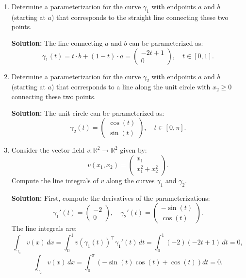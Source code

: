 \documentclass{article}
\begin{document}
\begin{enumerate}
    \item Determine a parameterization for the curve \(\gamma_1\) with endpoints \( a \) and \( b \) (starting at \( a \)) that corresponds to the straight line connecting these two points.
    
    \textbf{Solution:}
    The line connecting \( a \) and \( b \) can be parameterized as:
    \[
    \gamma_1(t) = t \cdot b + (1 - t) \cdot a = \begin{pmatrix} -2t + 1 \\ 0 \end{pmatrix}, \quad t \in [0, 1].
    \]

    \item Determine a parameterization for the curve \(\gamma_2\) with endpoints \( a \) and \( b \) (starting at \( a \)) that corresponds to a line along the unit circle with \( x_2 \geq 0 \) connecting these two points.
    
    \textbf{Solution:}
    The unit circle can be parameterized as:
    \[
    \gamma_2(t) = \begin{pmatrix} \cos(t) \\ \sin(t) \end{pmatrix}, \quad t \in [0, \pi].
    \]

    \item Consider the vector field \( v : \mathbb{R}^2 \rightarrow \mathbb{R}^2 \) given by:
    \[
    v(x_1, x_2) = \begin{pmatrix} x_1 \\ x_1^2 + x_2^2 \end{pmatrix}.
    \]
    Compute the line integrals of \( v \) along the curves \(\gamma_1\) and \(\gamma_2\).
    
    \textbf{Solution:}
    First, compute the derivatives of the parameterizations:
    \[
    \gamma_1'(t) = \begin{pmatrix} -2 \\ 0 \end{pmatrix}, \quad \gamma_2'(t) = \begin{pmatrix} -\sin(t) \\ \cos(t) \end{pmatrix}.
    \]
    The line integrals are:
    \[
    \int_{\gamma_1} v(x) \, dx = \int_{0}^{1} v(\gamma_1(t))^\top \gamma_1'(t) \, dt = \int_{0}^{1} (-2)(-2t + 1) \, dt = 0,
    \]
    \[
    \int_{\gamma_2} v(x) \, dx = \int_{0}^{\pi} \left( -\sin(t)\cos(t) + \cos(t) \right) dt = 0.
    \]


\end{enumerate}
\end{document}
